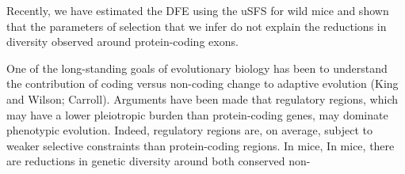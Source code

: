 \documentclass[11pt]{article}
\begin{document}
Recently, we have estimated the DFE using the uSFS for wild mice and shown that the parameters of selection that we infer do not explain the reductions in diversity observed around protein-coding exons. 


One of the long-standing goals of evolutionary biology has been to understand the contribution of coding versus non-coding change to adaptive evolution (King and Wilson; Carroll). Arguments have been made that regulatory regions, which may have a lower pleiotropic burden than protein-coding genes, may dominate phenotypic evolution. Indeed, regulatory regions are, on average,  subject to weaker selective constraints than protein-coding regions. In mice, 
In mice, there are reductions in genetic diversity around both conserved non-
\end{document}
